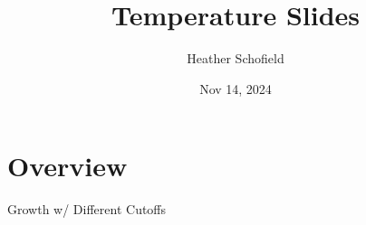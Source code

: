 \documentclass[aspectratio=169]{beamer}
\title{Temperature Slides}
\author{Heather Schofield}
\date{Nov 14, 2024}
\newcommand{\showtable}[1]
    { 
      \resizebox{0.75\textwidth}{!}{
          \begin{threeparttable}
              
          \end{threeparttable}
        }
    }
\newcommand{\showfigure}[1]{
\resizebox{1\textheight}{!}
  {
    \texttt{[image: /Users/st2246/Work/Temperature/output/figures/\#1]}
  }
}
\begin{document}

\section{Overview}
%
%
%



%
%

%

\begin{frame}{Growth w/ Different Cutoffs}
\begin{center}
    \showtable{table_growth_cutoff_changes.tex}
\end{center}
\end{frame}
\end{document}
